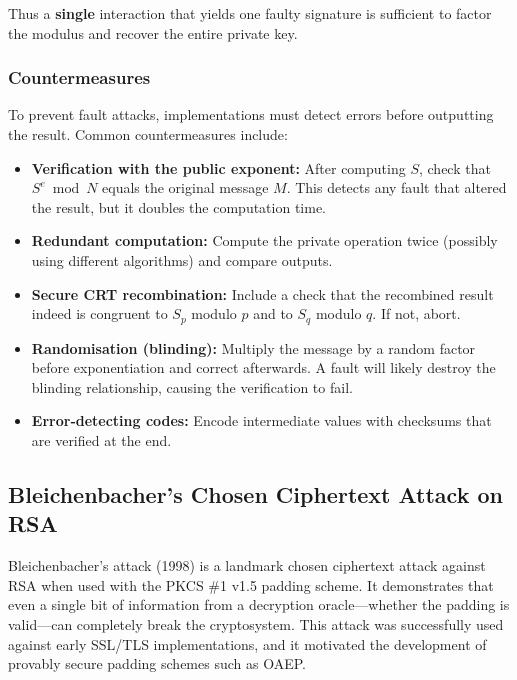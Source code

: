 Thus a \textbf{single} interaction that yields one faulty signature is sufficient to factor the modulus and recover the entire private key.

\subsubsection*{Countermeasures}

To prevent fault attacks, implementations must detect errors before outputting the result. Common countermeasures include:

\begin{itemize}
    \item \textbf{Verification with the public exponent:} After computing \(S\), check that \(S^e \bmod N\) equals the original message \(M\). This detects any fault that altered the result, but it doubles the computation time.

    \item \textbf{Redundant computation:} Compute the private operation twice (possibly using different algorithms) and compare outputs.

    \item \textbf{Secure CRT recombination:} Include a check that the recombined result indeed is congruent to \(S_p\) modulo \(p\) and to \(S_q\) modulo \(q\). If not, abort.

    \item \textbf{Randomisation (blinding):} Multiply the message by a random factor before exponentiation and correct afterwards. A fault will likely destroy the blinding relationship, causing the verification to fail.

    \item \textbf{Error‑detecting codes:} Encode intermediate values with checksums that are verified at the end.
\end{itemize}


\subsection{Bleichenbacher's Chosen Ciphertext Attack on RSA}

Bleichenbacher's attack (1998) is a landmark chosen ciphertext attack against RSA when used with the PKCS \#1 v1.5 padding scheme. It demonstrates that even a single bit of information from a decryption oracle—whether the padding is valid—can completely break the cryptosystem. This attack was successfully used against early SSL/TLS implementations, and it motivated the development of provably secure padding schemes such as OAEP.


